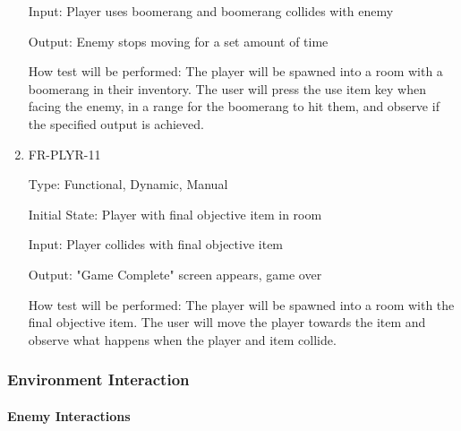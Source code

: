 \documentclass[12pt, titlepage]{article}
\begin{document}
\begin{enumerate}
Input: Player uses boomerang and boomerang collides with enemy

Output: Enemy stops moving for a set amount of time

How test will be performed: The player will be spawned into a room with a boomerang in their inventory. The user will press the use item key when facing the enemy, in a range for the boomerang to hit them, and observe if the specified output is achieved.

\item{FR-PLYR-11\\}

Type: Functional, Dynamic, Manual

Initial State: Player with final objective item in room

Input: Player collides with final objective item

Output: "Game Complete" screen appears, game over

How test will be performed: The player will be spawned into a room with the final objective item. The user will move the player towards the item and observe what happens when the player and item collide.

\end{enumerate}

\subsubsection{Environment Interaction}

\paragraph{Enemy Interactions}
\end{document}
